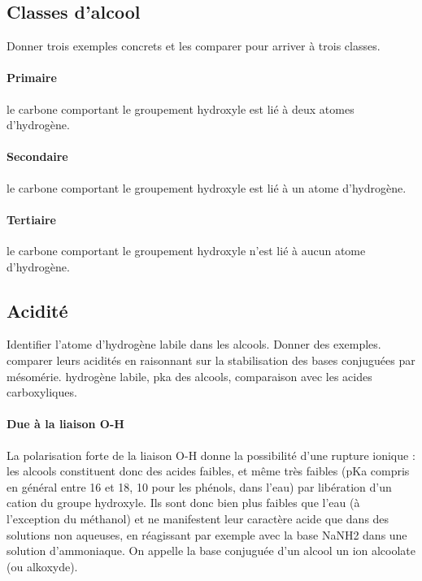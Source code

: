 \documentclass[11pt]{report}
\numberwithin{figure}{section}
\numberwithin{equation}{section}
\numberwithin{table}{section}
\newcommand{\1}{\boldsymbol{1}}
\begin{document}
\subsection{Classes d'alcool}

Donner trois exemples concrets et les comparer pour arriver à trois classes.

\paragraph{Primaire} le carbone comportant le groupement hydroxyle est lié à deux atomes d’hydrogène.

\paragraph{Secondaire} le carbone comportant le groupement hydroxyle est lié à un atome d’hydrogène.

\paragraph{Tertiaire} le carbone comportant le groupement hydroxyle n'est lié à aucun atome d'hydrogène.

\subsection{Acidité}

Identifier l’atome d’hydrogène labile dans les alcools. Donner des exemples. comparer leurs acidités en raisonnant sur la stabilisation des bases conjuguées par mésomérie. hydrogène labile, pka des alcools, comparaison avec les acides carboxyliques.

\paragraph{Due à la liaison O-H}

La polarisation forte de la liaison O-H donne la possibilité d'une rupture ionique : les alcools constituent donc des acides faibles, et même très faibles (pKa compris en général entre 16 et 18, 10 pour les phénols, dans l'eau) par libération d'un cation  du groupe hydroxyle. Ils sont donc bien plus faibles que l'eau (à l'exception du méthanol) et ne manifestent leur caractère acide que dans des solutions non aqueuses, en réagissant par exemple avec la base NaNH2 dans une solution d'ammoniaque. On appelle la base conjuguée d'un alcool un ion alcoolate (ou alkoxyde).
\end{document}
